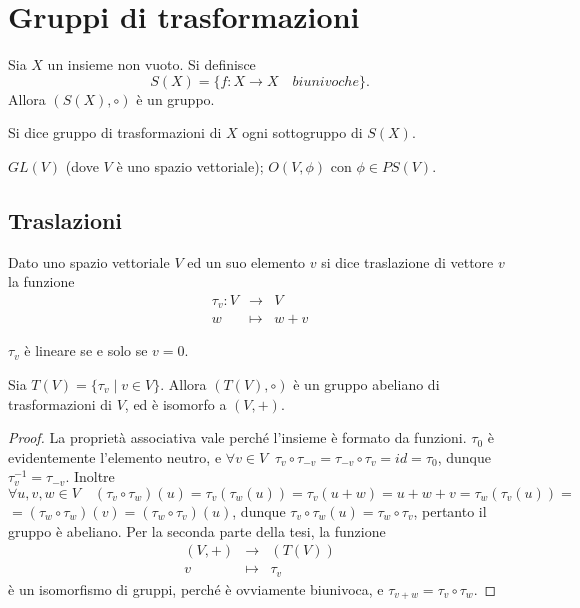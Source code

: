  
 \section{Gruppi di trasformazioni}
 
 Sia $ X $ un  insieme non vuoto. Si definisce $$S(X)=\{f:X\to X\quad biunivoche\}.$$ 
 Allora $(S(X),\circ)$ è un gruppo.
 
 \begin{definition}
 Si dice gruppo di trasformazioni di $X$ ogni sottogruppo di $S(X).$
 \end{definition}
 
 \begin{example}
 $GL(V)$ (dove $V$ è uno spazio vettoriale); $O(V,\phi)$ con $\phi\in PS(V).$
 \end{example}
 
 \subsection{Traslazioni}
  
 \begin{definition}
  Dato uno spazio vettoriale $V$ ed un suo elemento $v$ si dice traslazione di vettore $v$ la funzione
 \begin{eqnarray*}
	\tau_v:V & \to & V \\
	w & \mapsto & w+v
 \end{eqnarray*}
 \end{definition}
 
 \begin{remark}
  $\tau_v$ è lineare se e solo se $v=0$.
 \end{remark}
 
 \begin{proposition}
 Sia $T(V)=\{\tau_v\;|\;v\in V\}$. Allora $(T(V),\circ)$
 è un gruppo abeliano di trasformazioni di $V$, ed è isomorfo a $(V,+)$.
 \end{proposition}
 
 \begin{proof}
La proprietà associativa vale perché l'insieme è formato da funzioni.
 $\tau_0$ è evidentemente l'elemento neutro, e $\forall v\in V\;\; \tau_v\circ\tau_{-v}=\tau_{-v}\circ\tau_v=id=\tau_0$, 
 dunque $\tau_v^{-1}=\tau_{-v}$.
 Inoltre $\forall u,v,w\in V\quad (\tau_v\circ\tau_w)(u)=\tau_v(\tau_w(u))=\tau_v(u+w)=u+w+v=\tau_w(\tau_v(u))=$
 $=(\tau_w\circ\tau_w)(v)=(\tau_w\circ\tau_v)(u)$, dunque  $\tau_v\circ\tau_w(u)=\tau_w\circ\tau_v$,
  pertanto il gruppo è abeliano.
 Per la seconda parte della tesi, la funzione
 \begin{eqnarray*}
	(V,+) & \to & (T(V)) \\
	v & \mapsto & \tau_v
 \end{eqnarray*}
 è un isomorfismo di gruppi, perché è ovviamente biunivoca, e  $\tau_{v+w}=\tau_v\circ\tau_w$.
  \end{proof}
  
